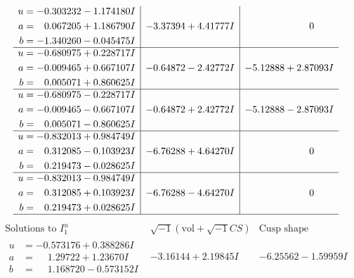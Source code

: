 \documentclass[1p]{elsarticle_modified}
\theoremstyle{definition}
\newcommand{\I}{\sqrt{-1}}
\begin{document}
$$\begin{array}{c|c|c}
\begin{aligned}
u &= -0.303232 - 1.174180 I \\
a &= \phantom{-}0.067205 + 1.186790 I \\
b &= -1.340260 - 0.045475 I\end{aligned}
 & -3.37394 + 4.41777 I & \phantom{-0.000000 } 0 \\ \hline\begin{aligned}
u &= -0.680975 + 0.228717 I \\
a &= -0.009465 + 0.667107 I \\
b &= \phantom{-}0.005071 + 0.860625 I\end{aligned}
 & -0.64872 - 2.42772 I & -5.12888 + 2.87093 I \\ \hline\begin{aligned}
u &= -0.680975 - 0.228717 I \\
a &= -0.009465 - 0.667107 I \\
b &= \phantom{-}0.005071 - 0.860625 I\end{aligned}
 & -0.64872 + 2.42772 I & -5.12888 - 2.87093 I \\ \hline\begin{aligned}
u &= -0.832013 + 0.984749 I \\
a &= \phantom{-}0.312085 - 0.103923 I \\
b &= \phantom{-}0.219473 - 0.028625 I\end{aligned}
 & -6.76288 + 4.64270 I & \phantom{-0.000000 } 0 \\ \hline\begin{aligned}
u &= -0.832013 - 0.984749 I \\
a &= \phantom{-}0.312085 + 0.103923 I \\
b &= \phantom{-}0.219473 + 0.028625 I\end{aligned}
 & -6.76288 - 4.64270 I & \phantom{-0.000000 } 0\\
 \hline 
 \end{array}$$\newpage$$\begin{array}{c|c|c}  
\text{Solutions to }I^u_{1}& \I (\text{vol} + \sqrt{-1}CS) & \text{Cusp shape}\\
 \hline 
\begin{aligned}
u &= -0.573176 + 0.388286 I \\
a &= \phantom{-}1.29722 + 1.23670 I \\
b &= \phantom{-}1.168720 - 0.573152 I\end{aligned}
 & -3.16144 + 2.19845 I & -6.25562 - 1.59959 I \\ \hline\begin{aligned}

\end{aligned}
\end{array}$$
\end{document}
